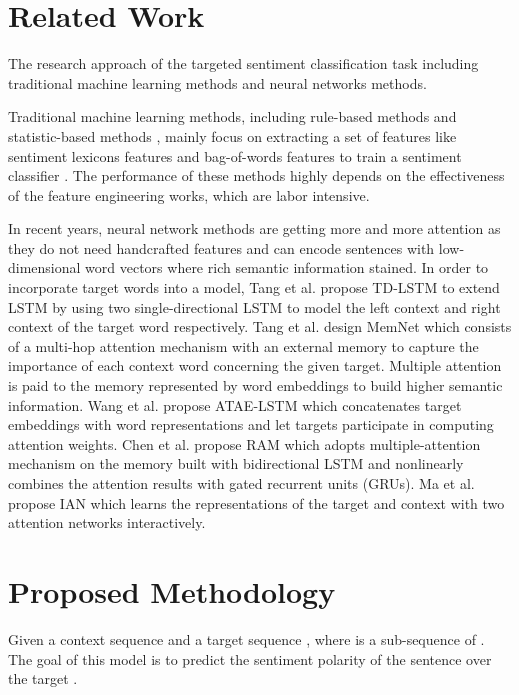 \documentclass[11pt,a4paper]{article}
\begin{document}
\section{Related Work}

The research approach of the targeted sentiment classification task including traditional machine learning methods and neural networks methods.

Traditional machine learning methods, including rule-based methods \cite{ding2008holistic} and statistic-based methods \cite{jiang2011target}, mainly focus on extracting a set of features like sentiment lexicons features and bag-of-words features to train a sentiment classifier \cite{rao2009semi}.
The performance of these methods highly depends on the effectiveness of the feature engineering works, which are labor intensive.

In recent years, neural network methods are getting more and more attention as they do not need handcrafted features and can encode sentences with low-dimensional word vectors where rich semantic information stained.
In order to incorporate target words into a model,
Tang et al.  propose TD-LSTM to extend LSTM by using two single-directional LSTM to model the left context and right context of the target word respectively.
Tang et al.  design MemNet which consists of a multi-hop attention mechanism with an external memory to capture the importance of each context word concerning the given target. Multiple attention is paid to the memory represented by word embeddings to build higher semantic information.
Wang et al.  propose ATAE-LSTM which concatenates target embeddings with word representations and let targets participate in computing attention weights.
Chen et al.  propose RAM which adopts multiple-attention mechanism on the memory built with bidirectional LSTM and nonlinearly combines the attention results with gated recurrent units (GRUs).
Ma et al.  propose IAN which learns the representations of the target and context with two attention networks interactively.

\section{Proposed Methodology}

Given a context sequence 
and a target sequence ,
where  is a sub-sequence of .
The goal of this model is to predict the sentiment polarity of the
sentence  over the target .
\end{document}
